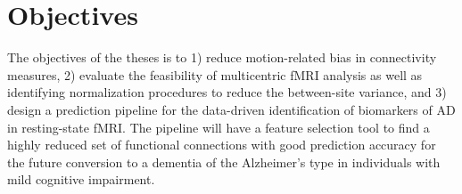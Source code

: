 \section{Objectives}
The objectives of the theses is to 1) reduce motion-related bias in connectivity measures, 2) evaluate the feasibility of multicentric fMRI analysis as well as identifying normalization procedures to reduce the between-site variance, and 3) design a prediction pipeline for the data-driven identification of biomarkers of AD in resting-state fMRI. The pipeline will have a feature selection tool to find a highly reduced set of functional connections with good prediction accuracy for the future conversion to a dementia of the Alzheimer's type in individuals with mild cognitive impairment.